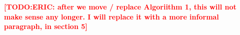 \documentclass{lncs/llncs}
\newcommand{\TODO}[1]{\textcolor{red}{\textbf{[TODO:#1]}}}
\newtheorem{alg}[theorem]{Algorithm}
\begin{document}
%
%
%
%
%
%
%
%

\TODO{ERIC: after we move / replace Algoriithm 1, this will not make sense any longer. I will replace it with a more informal paragraph, in section 5}

 

\end{document}
